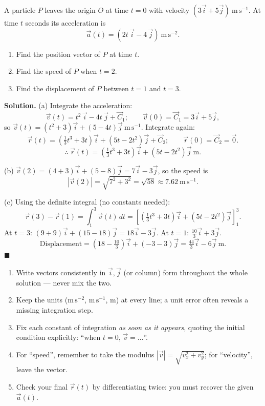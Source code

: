 \documentclass[11pt]{article}
\newcounter{popsec}
\newcounter{popsub}
\newcommand{\courssub}[1]{%
  \stepcounter{popsub}%
  \par\vspace{9pt}\noindent{\popxbold\fontsize{11.5}{13}\selectfont\color{popink}{\color{poporange}\thepopsec.\thepopsub}\hspace{6pt}#1}\par\nopagebreak\vspace{4pt}
}
\begin{document}
\courssub{GCE-Style Synthesis}

\begin{exoresolu}
A particle $P$ leaves the origin $O$ at time $t = 0$ with velocity $(3\vec{i} + 5\vec{j})\ \mathrm{m\,s^{-1}}$. At time $t$ seconds its acceleration is
\[
\vec{a}(t) = \left(2t\,\vec{i} - 4\,\vec{j}\right)\ \mathrm{m\,s^{-2}}.
\]
\begin{enumerate}
\item[(a)] Find the position vector of $P$ at time $t$.
\item[(b)] Find the speed of $P$ when $t = 2$.
\item[(c)] Find the displacement of $P$ between $t = 1$ and $t = 3$.
\end{enumerate}
\tcblower
\textbf{Solution.}
(a) Integrate the acceleration:
\[
\vec{v}(t) = t^2\,\vec{i} - 4t\,\vec{j} + \vec{C}_1; \qquad \vec{v}(0) = \vec{C}_1 = 3\vec{i} + 5\vec{j},
\]
so $\vec{v}(t) = (t^2 + 3)\vec{i} + (5 - 4t)\vec{j}\ \mathrm{m\,s^{-1}}$. Integrate again:
\[
\vec{r}(t) = \left(\tfrac13 t^3 + 3t\right)\vec{i} + \left(5t - 2t^2\right)\vec{j} + \vec{C}_2; \qquad \vec{r}(0) = \vec{C}_2 = \vec{0}.
\]
\[
\therefore\ \vec{r}(t) = \left(\tfrac13 t^3 + 3t\right)\vec{i} + \left(5t - 2t^2\right)\vec{j}\ \mathrm{m}.
\]

(b) $\vec{v}(2) = (4+3)\vec{i} + (5-8)\vec{j} = 7\vec{i} - 3\vec{j}$, so the speed is
\[
|\vec{v}(2)| = \sqrt{7^2 + 3^2} = \sqrt{58} \approx 7.62\ \mathrm{m\,s^{-1}}.
\]

(c) Using the definite integral (no constants needed):
\[
\vec{r}(3) - \vec{r}(1) = \int_1^3 \vec{v}(t)\,dt = \left[\left(\tfrac13 t^3 + 3t\right)\vec{i} + \left(5t - 2t^2\right)\vec{j}\right]_1^3.
\]
At $t = 3$: $(9 + 9)\vec{i} + (15 - 18)\vec{j} = 18\vec{i} - 3\vec{j}$. At $t = 1$: $\tfrac{10}{3}\vec{i} + 3\vec{j}$.
\[
\text{Displacement} = \left(18 - \tfrac{10}{3}\right)\vec{i} + (-3 - 3)\vec{j} = \tfrac{44}{3}\vec{i} - 6\vec{j}\ \mathrm{m}.
\]
\hfill$\blacksquare$
\end{exoresolu}

\begin{methode}
\begin{enumerate}
\item Write vectors consistently in $\vec{i},\vec{j}$ (or column) form throughout the whole solution --- never mix the two.
\item Keep the units ($\mathrm{m\,s^{-2}}$, $\mathrm{m\,s^{-1}}$, $\mathrm{m}$) at every line; a unit error often reveals a missing integration step.
\item Fix each constant of integration \emph{as soon as it appears}, quoting the initial condition explicitly: ``when $t=0$, $\vec{v} = \ldots$''.
\item For ``speed'', remember to take the modulus $|\vec{v}| = \sqrt{v_x^2 + v_y^2}$; for ``velocity'', leave the vector.
\item Check your final $\vec{r}(t)$ by differentiating twice: you must recover the given $\vec{a}(t)$.
\end{enumerate}
\end{methode}
\end{document}
